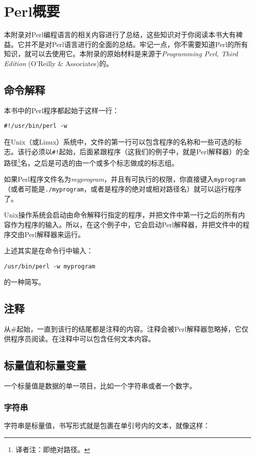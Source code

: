 \chapter{Perl概要}
\label{chap:chapterab}
\minitoc

本附录对Perl编程语言的相关内容进行了总结，这些知识对于你阅读本书大有裨益。它并不是对Perl语言进行的全面的总结。牢记一点，你不需要知道Perl的所有知识，就可以去使用它。本附录的原始材料是来源于\textit{Programming Perl, Third Edition} (O'Reilly \& Associates)的。

\section{命令解释}
本书中的Perl程序都起始于这样一行：

\begin{lstlisting}
#!/usr/bin/perl -w
\end{lstlisting}

在Unix（或Linux）系统中，文件的第一行可以包含程序的名称和一些可选的标志。该行必须以\verb|#!|起始，后面紧跟程序（这我们的例子中，就是Perl解释器）的全路径\footnote{译者注：即绝对路径。}名，之后是可选的由一个或多个标志做成的标志组。

如果Perl程序文件名为\textit{myprogram}，并且有可执行的权限，你直接键入\verb|myprogram|（或者可能是\verb|./myprogram|，或者是程序的绝对或相对路径名）就可以运行程序了。

Unix操作系统会启动由命令解释行指定的程序，并把文件中第一行之后的所有内容作为程序的输入。所以，在这个例子中，它会启动Perl解释器，并把文件中的程序交由Perl解释器来运行。

上述其实是在命令行中输入：

\begin{lstlisting}
/usr/bin/perl -w myprogram 
\end{lstlisting}

的一种简写。

\section{注释}
从\#起始，一直到该行的结尾都是注释的内容。注释会被Perl解释器忽略掉，它仅供程序员阅读。在注释中可以包含任何文本内容。

\section{标量值和标量变量}
一个标量值是数据的单一项目，比如一个字符串或者一个数字。

\subsection{字符串}
字符串是标量值，书写形式就是包裹在单引号内的文本，就像这样：


